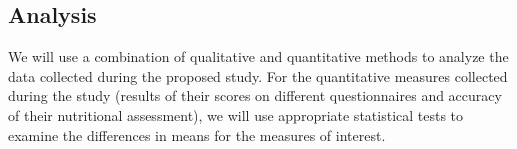 \subsection{Analysis}
We will use a combination of qualitative and quantitative methods to analyze the data collected during the proposed study. For the quantitative measures collected during the study (results of their scores on different questionnaires and accuracy of their nutritional assessment), we will use appropriate statistical tests to examine the differences in means for the measures of interest.




